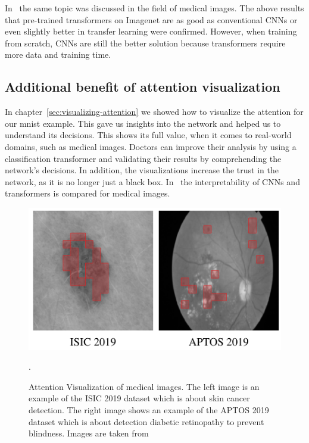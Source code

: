 \documentclass[a4paper]{scrartcl}
\begin{document}
    In~\cite{matsoukas2021isit} the same topic was discussed in the field of medical images.
    The above results that pre-trained transformers on Imagenet are as good as conventional CNNs or even slightly better in transfer learning were confirmed.
    However, when training from scratch, CNNs are still the better solution because transformers require more data and training time.

    \subsection{Additional benefit of attention visualization}\label{subsec:additional-benefit-of-attention-visualization}
    In chapter~\ref{sec:visualizing-attention} we showed how to visualize the attention for our mnist example.
    This gave us insights into the network and helped us to understand its decisions.
    This shows its full value, when it comes to real-world domains, such as medical images.
    Doctors can improve their analysis by using a classification transformer and validating their results by comprehending the network's decisions.
    In addition, the visualizations increase the trust in the network, as it is no longer just a black box.
    In~\cite{matsoukas2021isit} the interpretability of CNNs and transformers is compared for medical images.

    \begin{figure}[btp]
        \centering
        \includegraphics[width=0.8\linewidth]{img/MedicalVisualization}
        \caption[Attention Visualization on medical images]{Attention Visualization of medical images.
        The left image is an example of the ISIC 2019 dataset which is about skin cancer detection.
        The right image shows an example of the APTOS 2019 dataset which is about detection diabetic retinopathy to prevent blindness.
        Images are taken from~\cite{matsoukas2021isit}}.
        \label{fig:medical-visualization}
    \end{figure}
\end{document}

